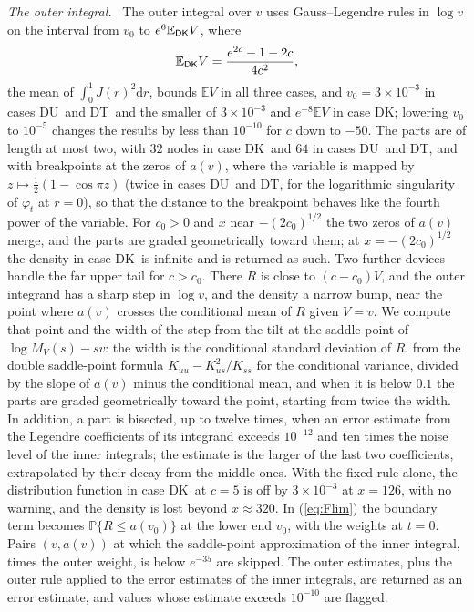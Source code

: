 \documentclass[ecta,nameyear,final,supplement]{econsocart}
\newcommand{\E}{{\mathbb E}}
\newcommand{\PP}{{\mathbb P}}
\newcommand{\dr}[1]{{\mathrm d}#1}
\newcommand{\Fk}{\textsf{\upshape DK}}
\newcommand{\Fu}{\textsf{\upshape DU}}
\newcommand{\Ft}{\textsf{\upshape DT}}
\theoremstyle{plain}
\theoremstyle{definition}
\newcommand{\runin}[1]{\par\medskip\noindent\textit{#1.}\ \ignorespaces}
\begin{document}
\runin{The outer integral}  The outer integral over $v$ uses Gauss--Legendre rules in $\log v$ on the interval from $v_0$ to $e^6\E_{\Fk}V$, where
\[
\E_{\Fk}V=\frac{e^{2c}-1-2c}{4c^2},
\]
the mean of $\int_0^1J(r)^2\dr{r}$, bounds $\E V$ in all three cases, and $v_0=3\times10^{-3}$ in cases \Fu\ and \Ft\ and the smaller of $3\times10^{-3}$ and $e^{-8}\E V$ in case \Fk; lowering $v_0$ to $10^{-5}$ changes the results by less than $10^{-10}$ for $c$ down to $-50$.  The parts are of length at most two, with $32$ nodes in case \Fk\ and $64$ in cases \Fu\ and \Ft, and with breakpoints at the zeros of $a(v)$, where the variable is mapped by $z\mapsto\frac12(1-\cos\pi z)$ (twice in cases \Fu\ and \Ft, for the logarithmic singularity of $\varphi_t$ at $r=0$), so that the distance to the breakpoint behaves like the fourth power of the variable.  For $c_0>0$ and $x$ near $-(2c_0)^{1/2}$ the two zeros of $a(v)$ merge, and the parts are graded geometrically toward them; at $x=-(2c_0)^{1/2}$ the density in case \Fk\ is infinite and is returned as such.  Two further devices handle the far upper tail for $c>c_0$.  There $R$ is close to $(c-c_0)V$, and the outer integrand has a sharp step in $\log v$, and the density a narrow bump, near the point where $a(v)$ crosses the conditional mean of $R$ given $V=v$.  We compute that point and the width of the step from the tilt at the saddle point of $\log M_V(s)-sv$: the width is the conditional standard deviation of $R$, from the double saddle-point formula $K_{uu}-K_{us}^2/K_{ss}$ for the conditional variance, divided by the slope of $a(v)$ minus the conditional mean, and when it is below $0.1$ the parts are graded geometrically toward the point, starting from twice the width.  In addition, a part is bisected, up to twelve times, when an error estimate from the Legendre coefficients of its integrand exceeds $10^{-12}$ and ten times the noise level of the inner integrals; the estimate is the larger of the last two coefficients, extrapolated by their decay from the middle ones.  With the fixed rule alone, the distribution function in case \Fk\ at $c=5$ is off by $3\times10^{-3}$ at $x=126$, with no warning, and the density is lost beyond $x\approx320$.  In (\ref{eq:Flim}) the boundary term becomes $\PP\{R\le a(v_0)\}$ at the lower end $v_0$, with the weights at $t=0$.  Pairs $(v,a(v))$ at which the saddle-point approximation of the inner integral, times the outer weight, is below $e^{-35}$ are skipped.  The outer estimates, plus the outer rule applied to the error estimates of the inner integrals, are returned as an error estimate, and values whose estimate exceeds $10^{-10}$ are flagged.
\end{document}
